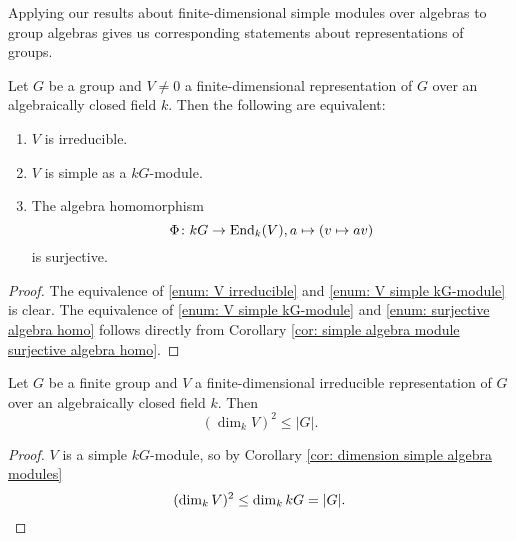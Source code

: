 Applying our results about finite-dimensional simple modules over algebras to group algebras gives us corresponding statements about representations of groups.


\begin{lem}\label{lem: equivalence to irreducible}
 Let $G$ be a group and $V \neq 0$ a finite-dimensional representation of $G$ over an algebraically closed field $k$. Then the following are equivalent:
 \begin{enumerate}[label=\emph{\roman*)},leftmargin=*]
  \item \label{enum: V irreducible}
   $V$ is irreducible.
  \item \label{enum: V simple kG-module}
   $V$ is simple as a $kG$-module.
  \item \label{enum: surjective algebra homo}
   The algebra homomorphism
   \[
    \Phi \colon kG \to \operatorname{End}_k(V), a \mapsto (v \mapsto av)
   \]
   is surjective.
 \end{enumerate}
\end{lem}
\begin{proof}
 The equivalence of \ref{enum: V irreducible} and \ref{enum: V simple kG-module} is clear. The equivalence of \ref{enum: V simple kG-module} and \ref{enum: surjective algebra homo} follows directly from Corollary \ref{cor: simple algebra module surjective algebra homo}.
\end{proof}


\begin{cor}
 Let $G$ be a finite group and $V$ a finite-dimensional irreducible representation of $G$ over an algebraically closed field $k$. Then
 \[
  \left( \dim_k V \right)^2 \leq |G|.
 \]
\end{cor}
\begin{proof}
 $V$ is a simple $kG$-module, so by Corollary \ref{cor: dimension simple algebra modules}
 \[
  (\dim_k V)^2 \leq \dim_k kG = |G|.
  \qedhere
 \]
\end{proof}


